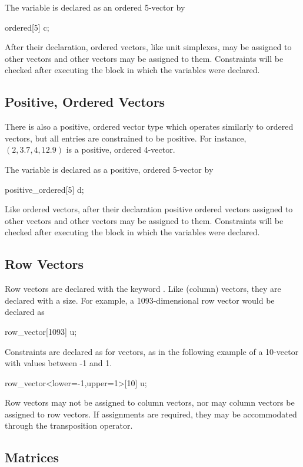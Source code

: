 The variable  is declared as an ordered 5-vector by
%
\begin{stancode}
ordered[5] c;
\end{stancode}
%
After their declaration, ordered vectors, like unit simplexes, may be
assigned to other vectors and other vectors may be assigned to them.
Constraints will be checked after executing the block in which the
variables were declared.


\subsection{Positive, Ordered Vectors}

There is also a positive, ordered vector type which operates similarly
to ordered vectors, but all entries are constrained to be positive.
For instance, $(2,3.7,4,12.9)$ is a positive, ordered 4-vector.

The variable  is declared as a positive, ordered 5-vector by
%
\begin{stancode}
positive_ordered[5] d;
\end{stancode}
%
Like ordered vectors, after their declaration positive ordered vectors
assigned to other vectors and other vectors may be assigned to them.
Constraints will be checked after executing the block in which the
variables were declared.

\subsection{Row Vectors}

Row vectors are declared with the keyword .
Like (column) vectors, they are declared with a size.  For example,
a 1093-dimensional row vector  would be declared as
%
\begin{stancode}
row_vector[1093] u;
\end{stancode}
%
Constraints are declared as for vectors, as in the following example
of a 10-vector with values between -1 and 1.
\begin{stancode}
row_vector<lower=-1,upper=1>[10] u;
\end{stancode}
%

Row vectors may not be assigned to column vectors, nor may column
vectors be assigned to row vectors.  If assignments are required, they
may be accommodated through the transposition operator.

\subsection{Matrices}

